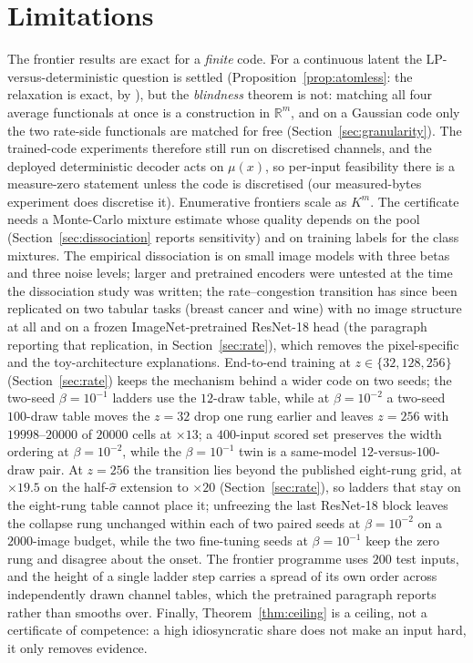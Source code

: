 \documentclass[11pt]{article}
\begin{document}
\section{Limitations}
The frontier results are exact for a \emph{finite} code. For a continuous latent the
LP-versus-deterministic question is settled (Proposition~\ref{prop:atomless}: the relaxation is
exact, by \citealp{dvoretzky1951}), but the \emph{blindness} theorem is not: matching all four
average functionals at once is a construction in $\mathbb R^m$, and on a Gaussian code only the
two rate-side functionals are matched for free (Section~\ref{sec:granularity}). The trained-code
experiments therefore still run on discretised channels, and the deployed deterministic decoder
acts on $\mu(x)$, so per-input feasibility there is a measure-zero statement unless the code is
discretised (our measured-bytes experiment does discretise it).
Enumerative frontiers scale as $K^m$. The certificate needs a Monte-Carlo mixture estimate whose
quality depends on the pool (Section~\ref{sec:dissociation} reports sensitivity) and on training
labels for the class mixtures. The empirical dissociation is on small image models with three
betas and three noise levels; larger and pretrained encoders were untested at the time the dissociation study was written;
the rate--congestion transition has since been replicated on two tabular tasks (breast cancer
and wine) with no image structure at all and on a frozen ImageNet-pretrained ResNet-18 head
(the paragraph reporting that replication, in Section~\ref{sec:rate}), which removes the pixel-specific
and the toy-architecture explanations. End-to-end training at $z\in\{32,128,256\}$
(Section~\ref{sec:rate}) keeps the mechanism behind a wider code on two seeds; the two-seed
$\beta=10^{-1}$ ladders use the $12$-draw table, while at $\beta=10^{-2}$ a two-seed $100$-draw
table moves the $z=32$ drop one rung earlier and leaves $z=256$ with $19998$--$20000$ of $20000$
cells at $\times13$; a $400$-input scored set preserves the width ordering at $\beta=10^{-2}$, while
the $\beta=10^{-1}$ twin is a same-model $12$-versus-$100$-draw pair.
At $z=256$ the transition lies beyond the published eight-rung grid, at $\times19.5$ on the
half-$\hat\sigma$ extension to $\times20$ (Section~\ref{sec:rate}), so ladders that stay on the
eight-rung table cannot place it; unfreezing the last ResNet-18 block leaves the
collapse rung unchanged within each of two paired seeds at $\beta=10^{-2}$ on a $2000$-image budget,
while the two fine-tuning seeds at $\beta=10^{-1}$ keep the zero rung and disagree about the onset.
The frontier programme uses $200$ test inputs, and the height of a single
ladder step carries a spread of its own order across independently drawn channel tables, which
the pretrained paragraph reports rather than smooths over. Finally,
Theorem~\ref{thm:ceiling} is a ceiling, not a certificate of competence: a high idiosyncratic
share does not make an input hard, it only removes evidence.
\end{document}
